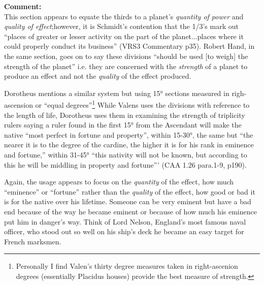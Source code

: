 \begin{mdframed}[backgroundcolor=cyan!5]
\small
\textbf{Comment:} \hfill \\
This section appears to equate the thirds to a planet's \textsl{quantity of power} and \textsl{quality of effect};however, it is Schmidt's contention that the 1/3's mark out ``places of greater or lesser activity on the part of the planet...places where it could properly conduct its business'' (VRS3 Commentary p35). Robert Hand, in the same section, goes on to say these divisions ``should be used [to weigh] the strength of the planet'' i.e. they are concerned with the \textsl{strength} of a planet to produce an effect and not the \textsl{quality} of the effect produced.

Dorotheus mentions a similar system but using 15° sections measured in righ-ascension or ``equal degrees''\footnote{\tiny Personally I find Valen's thirty degree measures taken in right-ascenion degrees (essentially Placidus houses) provide the best measure of strength.} While Valens uses the divisions with reference to the length of life, Dorotheus uses them in examining the strength of triplicity rulers saying a ruler found in the first 15° from the Ascendant will make the native ``most perfect in fortune and property'', within 15-30°, the same but ``the nearer it is to the degree of the cardine, the higher it is for his rank in eminence and fortune,'' within 31-45° ``this nativity will not be known, but according to this he will be middling in property and fortune'''  (CAA 1.26 para.1-9, p190). 

Again, the usage appears to focus on the \textsl{quantity} of the effect, how much ``eminence'' or ``fortune'' rather than the \textsl{quality} of the effect, how good or bad it is for the native over his lifetime. Someone can be very eminent but have a bad end because of the way he became eminent or because of how much his eminence put him in danger's way. Think of Lord Nelson, England's most famous naval officer, who stood out so well on his ship's deck he became an easy target for French marksmen.
\end{mdframed}

\newpage
